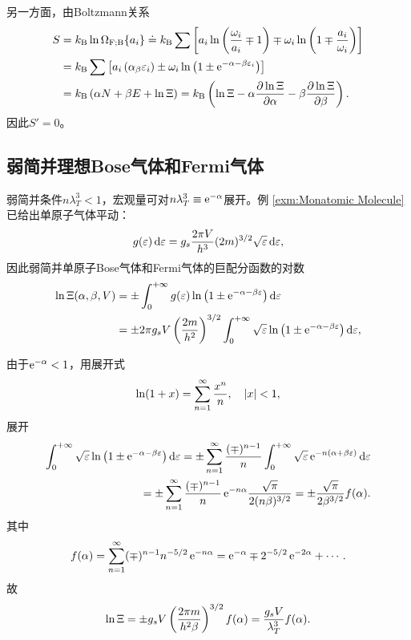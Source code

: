 另一方面，由Boltzmann关系
\begin{align*}
	S & =\kB\ln\Om[F;B]\doteq\kB\sum\fkh{a_i\ln\kh{\frac{\omega_i}{a_i}\mp 1}\mp\omega_i\ln\kh{1\mp\frac{a_i}{\omega_i}}} \\
	  & =\kB\sum\fkh{a_i\kh{\alpha_\beta\ve_i}\pm\omega_i\ln\kh{1\pm\e{-\alpha-\beta\ve_i}}}                             \\
	  & =\kB\kh{\alpha N+\beta E+\ln\Xi}=\kB\kh{\ln\Xi-\alpha\pv{\ln\Xi}\alpha-\beta\pv{\ln\Xi}\beta}.
\end{align*}
因此$S'=0$。
\subsection{弱简并理想Bose气体和Fermi气体}
弱简并条件$n\lambda_T^3<1$，宏观量可对$n\lambda_T^3\equiv\mathop{}\!\mathrm{e}^{-\alpha}$展开。例 \ref{exm:Monatomic Molecule} 已给出单原子气体平动：
\begin{align}
	g(\varepsilon)\mathop{}\!\mathrm{d}\varepsilon=g_s\frac{2\pi V}{h^3}(2m)^{3/2}\sqrt{\varepsilon}\mathop{}\!\mathrm{d}\varepsilon,
\end{align}
因此弱简并单原子Bose气体和Fermi气体的巨配分函数的对数
\begin{align*}
	\ln\Xi(\alpha,\beta,V) & =\pm\int_0^{+\infty} g(\varepsilon)\ln\left(1\pm\mathop{}\!\mathrm{e}^{-\alpha-\beta\varepsilon}\right)\mathop{}\!\mathrm{d}\varepsilon\\
	&=\pm 2\pi g_sV\left(\frac{2m}{h^2}\right)^{3/2}\int_0^{+\infty}\sqrt{\varepsilon}\ln\left(1\pm\mathop{}\!\mathrm{e}^{-\alpha-\beta\varepsilon}\right)\mathop{}\!\mathrm{d}\varepsilon,
\end{align*}

由于$\mathop{}\!\mathrm{e}^{-\alpha}<1$，用展开式
\[
	\ln(1+ x)=\sum_{n=1}^\infty\frac{x^n}n,\quad\left\lvert x\right\rvert<1,
\]
展开
\begin{align*}
	\int_0^{+\infty}\sqrt{\varepsilon}\ln\left(1\pm\mathop{}\!\mathrm{e}^{-\alpha-\beta\varepsilon}\right)\mathop{}\!\mathrm{d}\varepsilon=\pm\sum_{n=1}^\infty\frac{(\mp)^{n-1}}n\int_0^{+\infty}\sqrt{\varepsilon}\mathop{}\!\mathrm{e}^{-n(\alpha+\beta\varepsilon)}\mathop{}\!\mathrm{d}\varepsilon \\
	=\pm\sum_{n=1}^\infty\frac{(\mp )^{n-1}}n\mathop{}\!\mathrm{e}^{-n\alpha}\frac{\sqrt\pi}{2(n\beta)^{3/2}}=\pm\frac{\sqrt\pi}{2\beta^{3/2}}f(\alpha).
\end{align*}
其中
\[
	f(\alpha)=\sum_{n=1}^\infty(\mp)^{n-1}n^{-5/2}\mathop{}\!\mathrm{e}^{-n\alpha}=\mathop{}\!\mathrm{e}^{-\alpha}\mp 2^{-5/2}\mathop{}\!\mathrm{e}^{-2\alpha}+\cdots.
\]
故
\begin{align}
	\ln\Xi=\pm g_sV\left(\frac{2\pi m}{h^2\beta}\right)^{3/2}f(\alpha)=\frac{g_sV}{\lambda_T^3}f(\alpha).
\end{align}


